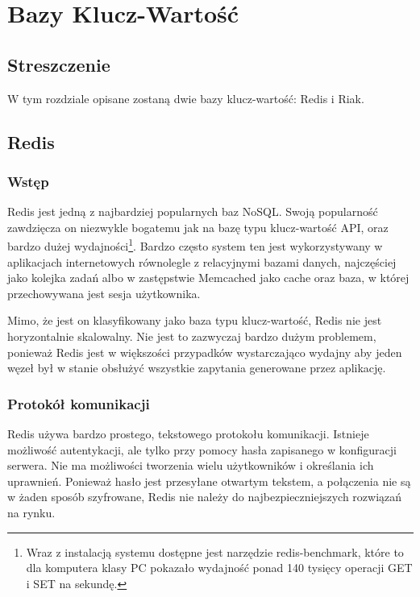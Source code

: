 \chapter{Bazy Klucz-Wartość}

\section*{Streszczenie}
W tym rozdziale opisane zostaną dwie bazy klucz-wartość: Redis i Riak.

\section{Redis}
\label{sec:redis}

\subsection*{Wstęp} 

Redis jest jedną z najbardziej popularnych baz NoSQL.
Swoją popularność zawdzięcza on niezwykle bogatemu jak na bazę typu klucz-wartość API, oraz bardzo dużej wydajności\footnote{Wraz z instalacją systemu dostępne jest narzędzie redis-benchmark, które to dla komputera klasy PC pokazało wydajność ponad 140 tysięcy operacji GET i SET na sekundę.}.
Bardzo często system ten jest wykorzystywany w aplikacjach internetowych równolegle z relacyjnymi bazami danych, najczęściej jako kolejka zadań albo w zastępstwie Memcached jako cache oraz baza, w której przechowywana jest sesja użytkownika.

Mimo, że jest on klasyfikowany jako baza typu klucz-wartość, Redis nie jest horyzontalnie skalowalny.
Nie jest to zazwyczaj bardzo dużym problemem, ponieważ Redis jest w większości przypadków wystarczająco wydajny aby jeden węzeł był w stanie obsłużyć wszystkie zapytania generowane przez aplikację.

\subsection*{Protokół komunikacji}

Redis używa bardzo prostego, tekstowego protokołu komunikacji.
Istnieje możliwość autentykacji, ale tylko przy pomocy hasła zapisanego w konfiguracji serwera.
Nie ma możliwości tworzenia wielu użytkowników i określania ich uprawnień.
Ponieważ hasło jest przesyłane otwartym tekstem, a połączenia nie są w żaden sposób szyfrowane, Redis nie należy do najbezpieczniejszych rozwiązań na rynku.


